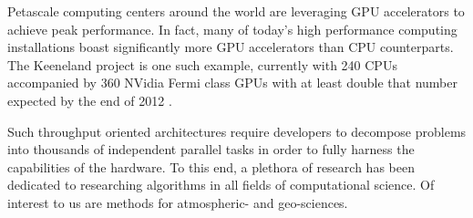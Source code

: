 
Petascale computing centers around the world are leveraging GPU accelerators to achieve peak performance. In fact, many of today's high performance computing installations boast significantly more GPU accelerators than CPU counterparts. The Keeneland project is one such example, currently with 240 CPUs accompanied by 360 NVidia Fermi class GPUs with at least double that number expected by the end of 2012 \cite{Vetter2011}. 

Such throughput oriented architectures require developers to decompose problems into thousands of independent parallel tasks in order to fully harness the capabilities of the hardware. To this end, a plethora of research has been dedicated to researching algorithms in all fields of computational science. Of interest to us are methods for atmospheric- and geo-sciences. 
